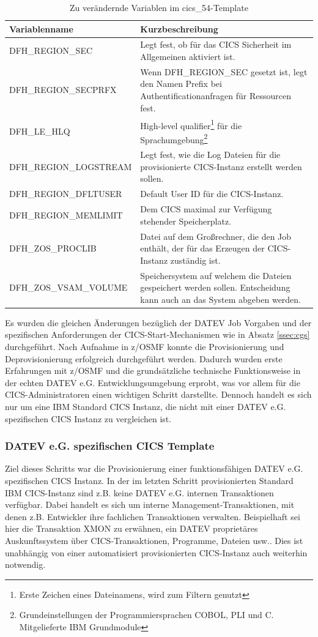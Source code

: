 \begin{table}[h]
\centering
\begin{tabularx}{\textwidth}{X|X}
Variablenname & Kurzbeschreibung \\
\hline
DFH\_REGION\_SEC & Legt fest, ob für das CICS Sicherheit im Allgemeinen aktiviert ist. \\
\hline
DFH\_REGION\_SECPRFX & Wenn DFH\_REGION\_SEC gesetzt ist, legt den Namen Prefix bei Authentificationanfragen für Ressourcen fest. \\
\hline
DFH\_LE\_HLQ & High-level qualifier\footnote{Erste Zeichen eines Dateinamens, wird zum Filtern genutzt} für die Sprachumgebung\footnote{Grundeinstellungen der Programmiersprachen COBOL, PLI und C. Mitgelieferte IBM Grundmodule} \\
\hline
DFH\_REGION\_LOGSTREAM & Legt fest, wie die Log Dateien für die provisionierte CICS-Instanz erstellt werden sollen. \\
\hline
DFH\_REGION\_DFLTUSER & Default User ID für die CICS-Instanz. \\
\hline
DFH\_REGION\_MEMLIMIT & Dem CICS maximal zur Verfügung stehender Speicherplatz. \\
\hline
DFH\_ZOS\_PROCLIB & Datei auf dem Großrechner, die den Job enthält, der für das Erzeugen der CICS-Instanz zuständig ist. \\
\hline
DFH\_ZOS\_VSAM\_VOLUME & Speichersystem auf welchem die Dateien gespeichert werden sollen. Entscheidung kann auch an das System abgeben werden. \\
\end{tabularx}
\caption{Zu verändernde Variablen im \glqq cics\_54\grqq-Template}
\label{tab:c54vars}
\end{table}
Es wurden die gleichen Änderungen bezüglich der DATEV Job Vorgaben und der spezifischen Anforderungen der CICS-Start-Mechanismen wie in Absatz \ref{ssec:cgs} durchgeführt.
Nach Aufnahme in z/OSMF konnte die Provisionierung und Deprovisionierung erfolgreich durchgeführt werden.
Dadurch wurden erste Erfahrungen mit z/OSMF und die grundsätzliche technische Funktionsweise in der echten DATEV e.G. Entwicklungsumgebung erprobt, was vor allem für die CICS-Administratoren einen wichtigen Schritt darstellte.
Dennoch handelt es sich nur um eine IBM Standard CICS Instanz, die nicht mit einer DATEV e.G. spezifischen CICS Instanz zu vergleichen ist.


\subsubsection{DATEV e.G. spezifischen CICS Template}\label{sssec:datevcics}
Ziel dieses  Schritts war die Provisionierung einer funktionsfähigen DATEV e.G. spezifischen CICS Instanz. 
In der im letzten Schritt provisionierten Standard IBM CICS-Instanz sind z.B. keine DATEV e.G. internen Transaktionen verfügbar.
Dabei handelt es sich um interne Management-Transaktionen, mit denen z.B. Entwickler ihre fachlichen Transaktionen verwalten. 
Beispielhaft sei hier die Transaktion XMON zu erwähnen, ein DATEV proprietäres Auskunftssystem über CICS-Transaktionen, Programme, Dateien usw..
Dies ist unabhängig von einer automatisiert provisionierten CICS-Instanz auch weiterhin notwendig.

